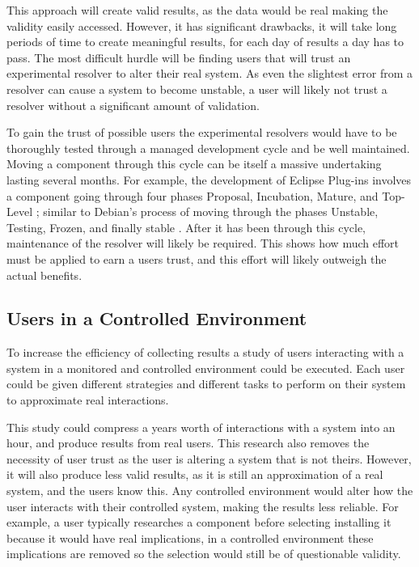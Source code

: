 This approach will create valid results, as the data would be real making the validity easily accessed. 
However, it has significant drawbacks,
it will take long periods of time to create meaningful results, for each day of results a day has to pass.
The most difficult hurdle will be finding users that will trust an experimental resolver to alter their real system.   
As even the slightest error from a resolver can cause a system to become unstable, a user will likely not trust a resolver without a significant amount of validation.

To gain the trust of possible users the experimental resolvers would have to be thoroughly tested through a managed development cycle and be well maintained.
Moving a component through this cycle can be itself a massive undertaking lasting several months. 
For example, the development of Eclipse Plug-ins involves a component going through four phases 
Proposal, Incubation, Mature, and Top-Level \cite{eclipseDevelmonetProject};
similar to Debian's process of moving through the phases Unstable, Testing, Frozen, and finally stable \cite{Barth2005}.
After it has been through this cycle, maintenance of the resolver will likely be required.
This shows how much effort must be applied to earn a users trust, and this effort will likely outweigh the actual benefits.

\subsection{Users in a Controlled Environment}
To increase the efficiency of collecting results a study of users interacting with a system in a monitored and controlled environment could be executed.
Each user could be given different strategies and different tasks to perform on their system to approximate real interactions.

This study could compress a years worth of interactions with a system into an hour, and produce results from real users. 
This research also removes the necessity of user trust as the user is altering a system that is not theirs.
However, it will also produce less valid results, as it is still an approximation of a real system, and the users know this.
Any controlled environment would alter how the user interacts with their controlled system, making the results less reliable.
For example, a user typically researches a component before selecting installing it because it would have real implications, 
in a controlled environment these implications are removed so the selection would still be of questionable validity.

